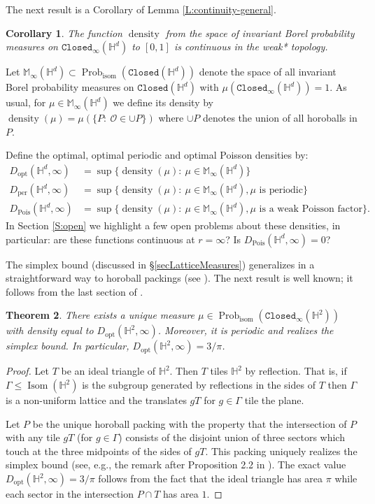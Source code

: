 \documentclass[11pt]{amsart}
\newtheorem{theorem}{Theorem}
\newtheorem{corollary}[theorem]{Corollary}
\theoremstyle{definition}
\theoremstyle{remark}
\renewcommand{\H}{\mathbb{H}}
\newcommand{\G}{\Gamma}
\newcommand{\M}{\mathbb{M}}
\newcommand{\cO}{\mathcal{O}}
\newcommand{\Closed}{\mathtt{Closed}}
\newcommand{\isom}{\operatorname{isom}}
\newcommand{\Isom}{\operatorname{Isom}}
\newcommand{\density}{\operatorname{density}}
\newcommand{\opt}{\operatorname{opt}}
\newcommand{\per}{\operatorname{per}}
\newcommand{\Pois}{\operatorname{Pois}}
\newcommand{\Prob}{\operatorname{Prob}}
\begin{document}
The next result is a Corollary of Lemma \ref{L:continuity-general}.
\begin{corollary}\label{cor:continuityofdensity2}
The function $\density$ from the space of invariant Borel probability measures on $\Closed_\infty(\H^d)$ to $[0,1]$ is continuous in the weak* topology.
\end{corollary}

Let $\M_\infty(\H^d) \subset \Prob_{\isom}(\Closed(\H^d))$ denote the space of all invariant Borel probability measures on $\Closed(\H^d)$ with $\mu(\Closed_\infty(\H^d))=1$. As usual, for $\mu \in \M_\infty(\H^d)$ we define its density by $\density(\mu)=\mu(\{P:~ \cO \in \cup P\})$ where $\cup P$ denotes the union of all horoballs in $P$.

Define the optimal, optimal periodic and optimal Poisson densities by: 
\begin{align*}
D_{\opt}(\H^d,\infty) &= \sup\{\density(\mu):~\mu \in \M_\infty(\H^d)\}\\
D_{\per}(\H^d,\infty) &= \sup\{\density(\mu):~\mu \in \M_\infty(\H^d), \mu \textrm{ is periodic} \}\\
D_{\Pois}(\H^d,\infty) &= \sup\{\density(\mu):~\mu \in \M_\infty(\H^d), \mu \textrm{ is a weak Poisson factor}\}.
\end{align*}
In Section \ref{S:open} we highlight a few open problems about these densities, in particular: are these functions continuous at $r=\infty$? Is $D_{\Pois}(\H^d,\infty)=0$? 

The simplex bound (discussed in \S \ref{secLatticeMeasures}) generalizes in a straightforward way to horoball packings (see \cite[Theorem 4]{boroczky1978packing}). The next result is well known; it follows from the last section of \cite{boroczky1978packing}.
\begin{theorem}\label{T:horoball1}
    There exists a unique measure $\mu \in \Prob_{\isom}(\Closed_\infty(\H^2))$ with density equal to $D_{\opt}(\H^2,\infty)$. Moreover, it is periodic and realizes the simplex bound. In particular, $D_{\opt}(\H^2,\infty)=3/\pi$.
\end{theorem}
\begin{proof}
    Let $T$ be an ideal triangle of $\H^2$. Then $T$ tiles $\H^2$ by reflection. That is, if $\G\le \Isom(\H^2)$ is the subgroup generated by reflections in the sides of $T$ then $\G$ is a non-uniform lattice and the translates $gT$ for $g\in \G$ tile the plane. 

    Let $P$ be the unique horoball packing with the property that the intersection of $P$ with any tile $gT$ (for $g\in \G$) consists of the disjoint union of three sectors which touch at the three midpoints of the sides of $gT$. This packing uniquely realizes the simplex bound (see, e.g., the remark after Proposition 2.2 in \cite{kellerhals1998ball}).  The exact value $D_{\opt}(\H^2,\infty)=3/\pi$ follows from the fact that the ideal triangle has area $\pi$ while each sector in the intersection $P \cap T$ has area $1$.
\end{proof}
\end{document}
